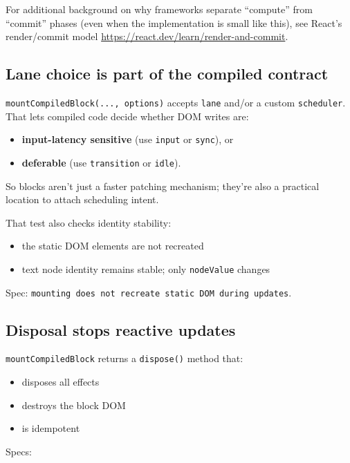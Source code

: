 For additional background on why frameworks separate ``compute'' from ``commit'' phases (even when the implementation is small like this), see React's render/commit model \href{https://react.dev/learn/render-and-commit}{https://react.dev/learn/render-and-commit}.

\subsection{Lane choice is part of the compiled contract}

  	\texttt{mountCompiledBlock(..., options)} accepts \texttt{lane} and/or a custom \texttt{scheduler}.
That lets compiled code decide whether DOM writes are:

\begin{itemize}
  \item \textbf{input-latency sensitive} (use \texttt{input} or \texttt{sync}), or
  \item \textbf{deferable} (use \texttt{transition} or \texttt{idle}).
\end{itemize}

So blocks aren't just a faster patching mechanism; they're also a practical location to attach scheduling intent.

That test also checks identity stability:

\begin{itemize}
  \item the static DOM elements are not recreated
  \item text node identity remains stable; only \texttt{nodeValue} changes
\end{itemize}

Spec: \texttt{mounting does not recreate static DOM during updates}.

\subsection{Disposal stops reactive updates}

\texttt{mountCompiledBlock} returns a \texttt{dispose()} method that:

\begin{itemize}
  \item disposes all effects
  \item destroys the block DOM
  \item is idempotent
\end{itemize}

Specs:

